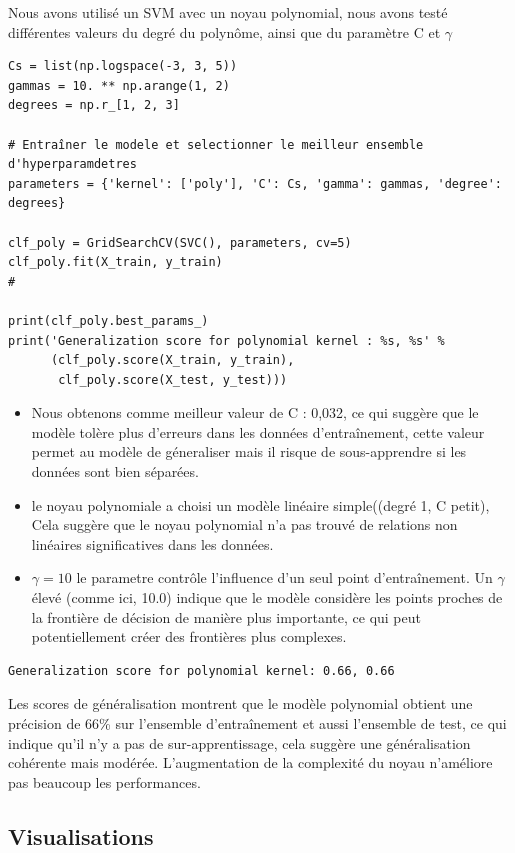 \documentclass[12pt,a4paper]{report}
\begin{document}
Nous avons utilisé un SVM avec un noyau polynomial, nous avons testé différentes
 valeurs du degré du polynôme, ainsi que du paramètre C et $\gamma$ 
 \begin{lstlisting}
Cs = list(np.logspace(-3, 3, 5))
gammas = 10. ** np.arange(1, 2)
degrees = np.r_[1, 2, 3]

# Entraîner le modele et selectionner le meilleur ensemble d'hyperparamdetres
parameters = {'kernel': ['poly'], 'C': Cs, 'gamma': gammas, 'degree': degrees}

clf_poly = GridSearchCV(SVC(), parameters, cv=5)
clf_poly.fit(X_train, y_train)
# 

print(clf_poly.best_params_)
print('Generalization score for polynomial kernel : %s, %s' %
      (clf_poly.score(X_train, y_train),
       clf_poly.score(X_test, y_test)))

\end{lstlisting}
\begin{itemize}
\item Nous obtenons comme meilleur valeur de C : 0,032,  ce qui suggère que le modèle tolère plus d’erreurs dans les données d’entraînement, cette valeur permet au modèle de géneraliser mais il risque de sous-apprendre si les données sont bien séparées. 
\item le noyau polynomiale a choisi un modèle linéaire simple((degré 1, C petit), Cela suggère que le noyau polynomial n’a pas trouvé de relations non linéaires significatives dans les données.
\item $\gamma = 10$ le parametre  contrôle l’influence d’un seul point d’entraînement. Un $\gamma$ élevé (comme ici, 10.0) indique que le modèle considère les points proches de la frontière de décision de manière plus importante, ce qui peut potentiellement créer des frontières plus complexes.
\end{itemize}
\begin{lstlisting}
Generalization score for polynomial kernel: 0.66, 0.66
\end{lstlisting}
 Les scores de généralisation montrent que le modèle polynomial obtient une précision de 66\% sur l’ensemble d’entraînement et aussi l'ensemble de test, ce qui indique qu'il n'y a pas de sur-apprentissage, cela suggère une généralisation cohérente mais modérée. L’augmentation de la complexité du noyau n’améliore pas beaucoup les performances.  
 \newpage 
 
\subsection{ Visualisations }
\end{document}
